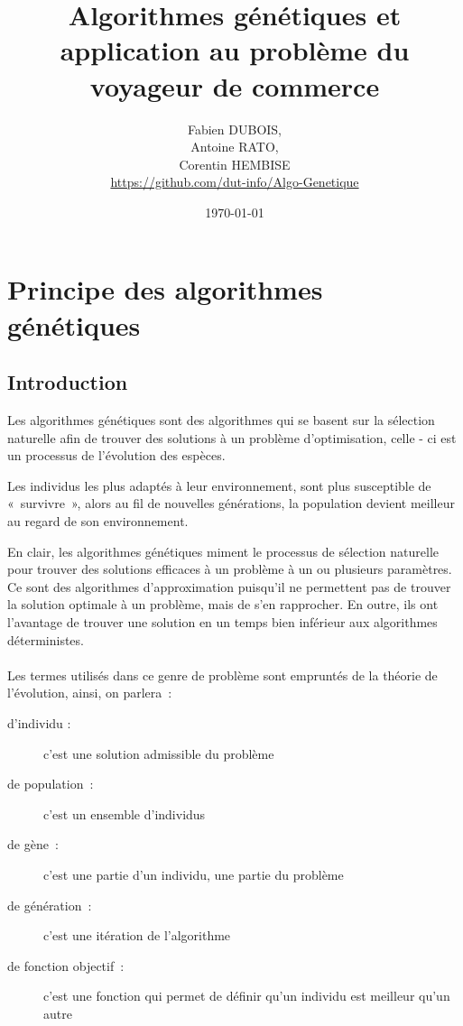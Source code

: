 \documentclass{article}
\begin{document}
\title{Algorithmes génétiques et application au problème du voyageur de commerce}
\author{Fabien DUBOIS,\\
   Antoine RATO,\\
   Corentin HEMBISE\\
   \url{https://github.com/dut-info/Algo-Genetique}\\}
\date{\today}

\maketitle

\tableofcontents

\newpage
\section{Principe des algorithmes génétiques}
	\subsection{Introduction}
	Les algorithmes génétiques sont des algorithmes qui se basent sur la sélection naturelle afin de trouver des solutions à un problème d'optimisation, celle - ci est un processus de l'évolution des espèces.
	
	Les individus les plus adaptés à leur environnement, sont plus susceptible de « survivre », alors au fil de nouvelles générations, la population devient meilleur au regard de son environnement.

	En clair, les algorithmes génétiques miment le processus de sélection naturelle pour trouver des solutions efficaces à un problème à un ou plusieurs paramètres.
	Ce sont des algorithmes d'approximation puisqu'il ne permettent pas de trouver la solution optimale à un problème, mais de s'en rapprocher. En outre, ils ont l'avantage de trouver une solution en un temps bien inférieur aux algorithmes déterministes.

    \paragraph{}
	Les termes utilisés dans ce genre de problème sont empruntés de la théorie de l'évolution, ainsi, on parlera :
	\begin{description}
	\item [d'individu :] c'est une solution admissible du problème
	\item [de population :] c'est un ensemble d'individus
	\item [de gène :] c'est une partie d'un individu, une partie du problème
	\item [de génération :] c'est une itération de l'algorithme
	\item [de fonction objectif :] c'est une fonction qui permet de définir qu'un individu est meilleur qu'un autre
	\end{description}
\end{document}
